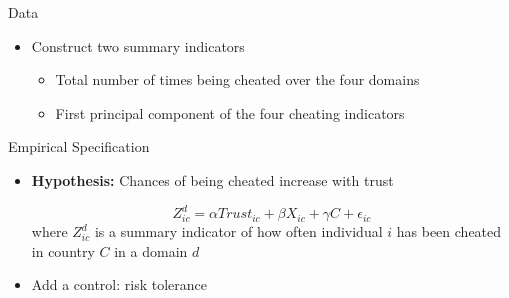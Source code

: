 \documentclass[pdftex,12pt,xcolor=pdftex,table]{beamer}
\begin{document}
\begin{frame}{Data}
    \begin{itemize}
        \item Construct two summary indicators
        \begin{itemize}
            \item Total number of times being cheated over the four domains
            \item First principal component of the four cheating indicators
        \end{itemize}
    \end{itemize}
\end{frame}
\begin{frame}{Empirical Specification}
    \begin{itemize}
        \item \textbf{Hypothesis:} Chances of being cheated increase with trust
    
    \begin{equation*}
        Z_{ic}^d=\alpha Trust_{ic} + \beta X_{ic} + \gamma C + \epsilon_{ic}
    \end{equation*}
    where $Z_{ic}^d$ is a summary indicator of how often individual $i$ has been cheated in country $C$ in a domain $d$ \pause
    \vspace{0.2cm}
    \item Add a control: risk tolerance
    \end{itemize}
\end{frame}
\end{document}
